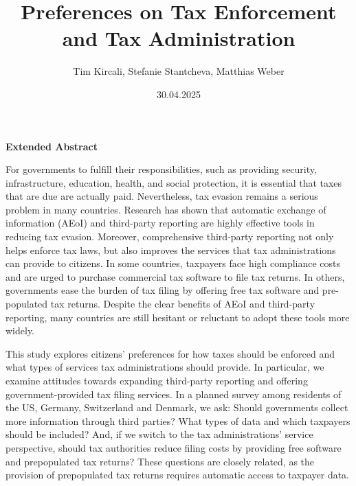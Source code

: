 \documentclass[12pt]{article}
\title{\textbf{\large{Preferences on Tax Enforcement and Tax Administration}}}
\author{\normalsize{Tim Kircali, Stefanie Stantcheva, Matthias Weber}}
\date{\normalsize{30.04.2025}}
\begin{document}
\maketitle
{}
\begin{center}
\textbf{Extended Abstract}  
\end{center}
For governments to fulfill their responsibilities, such as providing security, infrastructure, education, health, and social protection, it is essential that taxes that are due are actually paid. Nevertheless, tax evasion remains a serious problem in many countries. Research has shown that automatic exchange of information (AEoI) and third-party reporting are highly effective tools in reducing tax evasion. Moreover, comprehensive third-party reporting not only helps enforce tax laws, but also improves the services that tax administrations can provide to citizens. In some countries, taxpayers face high compliance costs and are urged to purchase commercial tax software to file tax returns. In others, governments ease the burden of tax filing by offering free tax software and pre-populated tax returns. Despite the clear benefits of AEoI and third-party reporting, many countries are still hesitant or reluctant to adopt these tools more widely.

This study explores citizens' preferences for how taxes should be enforced and what types of services tax administrations should provide. In particular, we examine attitudes towards expanding third-party reporting and offering government-provided tax filing services. In a planned survey among residents of the US, Germany, Switzerland and Denmark, we ask: Should governments collect more information through third parties? What types of data and which taxpayers should be included? And, if we switch to the tax administrations' service perspective, should tax authorities reduce filing costs by providing free software and prepopulated tax returns? These questions are closely related, as the provision of prepopulated tax returns requires automatic access to taxpayer data.
\end{document}
